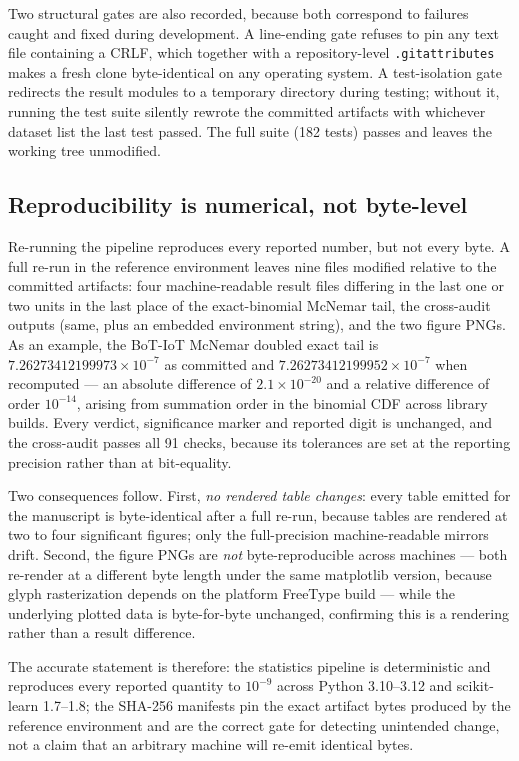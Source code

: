 Two structural gates are also recorded, because both correspond to failures caught and fixed during
development. A line-ending gate refuses to pin any text file containing a CRLF, which together with a
repository-level \texttt{.gitattributes} makes a fresh clone byte-identical on any operating system. A
test-isolation gate redirects the result modules to a temporary directory during testing; without it,
running the test suite silently rewrote the committed artifacts with whichever dataset list the last test
passed. The full suite (182 tests) passes and leaves the working tree unmodified.

\subsection{Reproducibility is numerical, not byte-level}
\label{sec:appendix-determinism}

Re-running the pipeline reproduces every reported number, but not every byte. A full re-run in the reference
environment leaves nine files modified relative to the committed artifacts: four machine-readable result
files differing in the last one or two units in the last place of the exact-binomial McNemar tail, the
cross-audit outputs (same, plus an embedded environment string), and the two figure PNGs. As an example, the
BoT-IoT McNemar doubled exact tail is $7.26273412199973 \times 10^{-7}$ as committed and
$7.26273412199952 \times 10^{-7}$ when recomputed --- an absolute difference of $2.1 \times 10^{-20}$ and a
relative difference of order $10^{-14}$, arising from summation order in the binomial CDF across library
builds. Every verdict, significance marker and reported digit is unchanged, and the cross-audit passes all
91 checks, because its tolerances are set at the reporting precision rather than at bit-equality.

Two consequences follow. First, \emph{no rendered table changes}: every table emitted for the manuscript is
byte-identical after a full re-run, because tables are rendered at two to four significant figures; only the
full-precision machine-readable mirrors drift. Second, the figure PNGs are \emph{not} byte-reproducible
across machines --- both re-render at a different byte length under the same matplotlib version, because
glyph rasterization depends on the platform FreeType build --- while the underlying plotted data is
byte-for-byte unchanged, confirming this is a rendering rather than a result difference.

The accurate statement is therefore: the statistics pipeline is deterministic and reproduces every reported
quantity to $10^{-9}$ across Python 3.10--3.12 and scikit-learn 1.7--1.8; the SHA-256 manifests pin the exact
artifact bytes produced by the reference environment and are the correct gate for detecting unintended
change, not a claim that an arbitrary machine will re-emit identical bytes.

